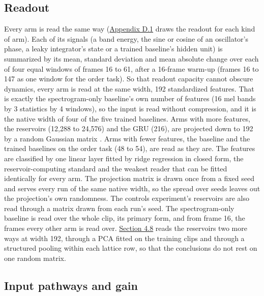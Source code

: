 \documentclass{article}
\begin{document}
\subsection{Readout}\label{sec-3-3}

Every arm is read the same way (\hyperref[sec-D-1]{Appendix D.1} draws
the readout for each kind of arm). Each of its signals (a band energy,
the sine or cosine of an oscillator's phase, a leaky integrator's state
or a trained baseline's hidden unit) is summarized by its mean, standard
deviation and mean absolute change over each of four equal windows of
frames 16 to 61, after a 16-frame warm-up (frames 16 to 147 as one
window for the order task). So that readout capacity cannot obscure
dynamics, every arm is read at the same width, 192 standardized
features. That is exactly the spectrogram-only baseline's own number of
features (16 mel bands by 3 statistics by 4 windows), so the input is
read without compression, and it is the native width of four of the five
trained baselines. Arms with more features, the reservoirs (12,288 to
24,576) and the GRU (216), are projected down to 192 by a random
Gaussian matrix \citep{johnson1984}. Arms with fewer features, the
baseline and the trained baselines on the order task (48 to 54), are
read as they are. The features are classified by one linear layer fitted
by ridge regression in closed form, the reservoir-computing standard
\citep{jaeger2001, lukosevicius2012} and the weakest reader that can be
fitted identically for every arm. The projection matrix is drawn once
from a fixed seed and serves every run of the same native width, so the
spread over seeds leaves out the projection's own randomness. The
controls experiment's reservoirs are also read through a matrix drawn
from each run's seed. The spectrogram-only baseline is read over the
whole clip, its primary form, and from frame 16, the frames every other
arm is read over. \hyperref[sec-4-8]{Section 4.8} reads the reservoirs
two more ways at width 192, through a PCA fitted on the training clips
and through a structured pooling within each lattice row, so that the
conclusions do not rest on one random matrix.

\subsection{Input pathways and gain}\label{sec-3-4}
\end{document}
